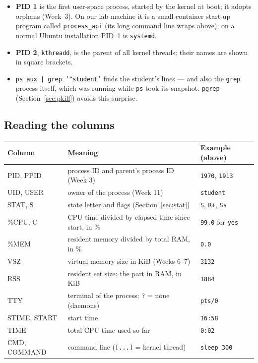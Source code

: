 \documentclass[11pt,a4paper]{article}
\newcommand{\cmd}[1]{\texttt{#1}}
\begin{document}
\begin{itemize}
  \item \textbf{PID 1} is the first user-space process, started by the kernel at boot; it adopts orphans (Week~3). On our lab machine it is a small container start-up program called \texttt{process\_api} (its long command line wraps above); on a normal Ubuntu installation PID~1 is \cmd{systemd}.
  \item \textbf{PID 2}, \texttt{kthreadd}, is the parent of all kernel threads; their names are shown in square brackets.
  \item \cmd{ps aux | grep '\textasciicircum student'} finds the student's lines --- and also the \cmd{grep} process itself, which was running while \cmd{ps} took its snapshot. \cmd{pgrep} (Section~\ref{sec:pkill}) avoids this surprise.
\end{itemize}

\subsection{Reading the columns}

\begin{center}
\renewcommand{\arraystretch}{1.25}
\begin{tabularx}{\linewidth}{>{\ttfamily}l >{\raggedright\arraybackslash}X l}
\toprule
\textbf{\rmfamily Column} & \textbf{Meaning} & \textbf{Example (above)} \\
\midrule
PID, PPID & process ID and parent's process ID (Week 3) & \texttt{1970}, \texttt{1913}\\
UID, USER & owner of the process (Week 11) & \texttt{student}\\
STAT, S & state letter and flags (Section~\ref{sec:stat}) & \texttt{S}, \texttt{R+}, \texttt{Ss}\\
\%CPU, C & CPU time divided by elapsed time since start, in \% & \texttt{99.0} for \cmd{yes}\\
\%MEM & resident memory divided by total RAM, in \% & \texttt{0.0}\\
VSZ & virtual memory size in KiB (Weeks 6--7) & \texttt{3132}\\
RSS & resident set size: the part in RAM, in KiB & \texttt{1884}\\
TTY & terminal of the process; \texttt{?} = none (daemons) & \texttt{pts/0}\\
STIME, START & start time & \texttt{16:58}\\
TIME & total CPU time used so far & \texttt{0:02}\\
CMD, COMMAND & command line (\texttt{[...]} = kernel thread) & \texttt{sleep 300}\\
\bottomrule
\end{tabularx}
\end{center}
\end{document}
